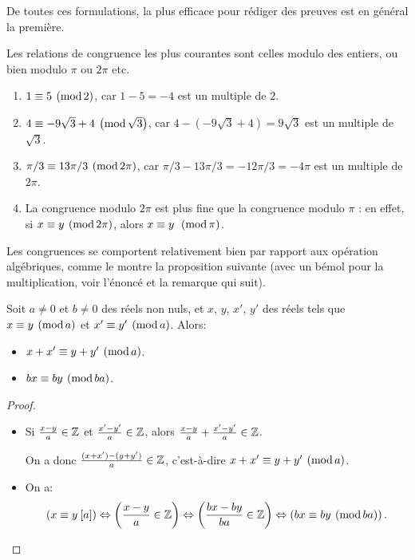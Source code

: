 De toutes ces formulations, la plus efficace pour rédiger des preuves est en général la première.

Les relations de congruence les plus courantes sont celles modulo des entiers, ou bien modulo $\pi$ ou $2\pi$ etc.


\begin{exemples}
\begin{enumerate}[label=\alph*)]
\item $1 \equiv 5 \:\left(\operatorname{mod}2\right)$, car $1-5 = -4$ est un multiple de $2$.
\item $4\equiv -9\sqrt{3}+4 \:\left(\operatorname{mod}\sqrt{3}\right)$, car $4 - (-9\sqrt{3}+4) = 9\sqrt{3}$ est un multiple de $\sqrt{3}$.
\item $\pi/3 \equiv 13\pi/3 \:\left(\operatorname{mod}2\pi\right)$, car $\pi/3 - 13\pi/3 = -12\pi/3 = -4\pi$ est un multiple de $2\pi$.
\item La congruence modulo $2\pi$ est plus fine que la congruence modulo $\pi$ : en effet, si $x\equiv y \:\left(\operatorname{mod}2\pi\right)$, alors $x\equiv y\: \:\left(\operatorname{mod}\pi\right)$.
\end{enumerate}
\end{exemples}

Les congruences se comportent relativement bien par rapport aux opération algébriques, comme le montre la proposition suivante (avec un bémol pour la multiplication, voir l'énoncé et la remarque qui suit).

\begin{proposition} Soit $a\neq 0$ et $b\neq 0$ des réels non nuls, et $x$, $y$, $x'$, $y'$ des réels tels que $x \equiv y\:\left(\operatorname{mod}a\right)$ et $x' \equiv y'\:\left(\operatorname{mod}a\right)$. Alors:
\begin{itemize}
\item[i)]{$x+x' \equiv y+y'\:\left(\operatorname{mod}a\right)$.}
\item[ii)]{$bx\equiv by \:\left(\operatorname{mod}ba\right)$.}
\end{itemize}
\end{proposition}
\begin{proof}
\begin{itemize}
\item[i)]{Si $\frac{x-y}{a} \in \mathbb{Z}$ et $\frac{x'-y'}{a} \in \mathbb{Z}$, alors $\frac{x-y}{a}+\frac{x'-y'}{a} \in \mathbb{Z}$.

On a donc $\frac{(x+x')-(y+y')}{a} \in \mathbb{Z}$, c'est-à-dire $x+x' \equiv y+y'\:\left(\operatorname{mod}a\right)$.}
\item[ii)]{On a:
\[\left(x\equiv y \: [a]\right) \Leftrightarrow  \left(\frac{x-y}{a} \in \mathbb{Z}\right) \Leftrightarrow \left(\frac{bx-by}{ba} \in \mathbb{Z}\right) \Leftrightarrow \left(bx\equiv by \:\left(\operatorname{mod}ba\right)\right).\]}
\end{itemize}
\end{proof}

